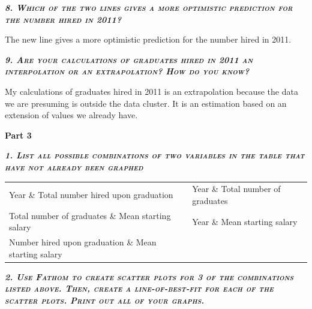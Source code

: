 \documentclass{article}
\begin{document}
\textbf{\emph{\textsc{8. Which of the two lines gives a more optimistic prediction for the number hired in 2011?}}}

The new line gives a more optimistic prediction for the number hired in 2011.

\textbf{\emph{\textsc{9. Are your calculations of graduates hired in 2011 an interpolation or an extrapolation? How do you know?}}}

My calculations of graduates hired in 2011 is an extrapolation because the 
data we are presuming is outside the data cluster. It is an estimation based on an extension of values we already have.

\newpage

\textbf{{\huge Part 3}}

\textbf{\emph{\textsc{1. List all possible combinations of two variables in the table that have not already been graphed}}}

\begin{tabular}{l l}
    Year \& Total number hired upon graduation & Year \& Total number of graduates 
    \\ 
    Total number of graduates \& Mean starting salary & Year \& Mean starting salary
    \\
    Number hired upon graduation \& Mean starting salary
\end{tabular}

\textbf{\emph{\textsc{2. Use Fathom to create scatter plots for 3 of the combinations listed above. Then, create a line-of-best-fit for each of the scatter plots. Print out all of your graphs.}}}
\end{document}
